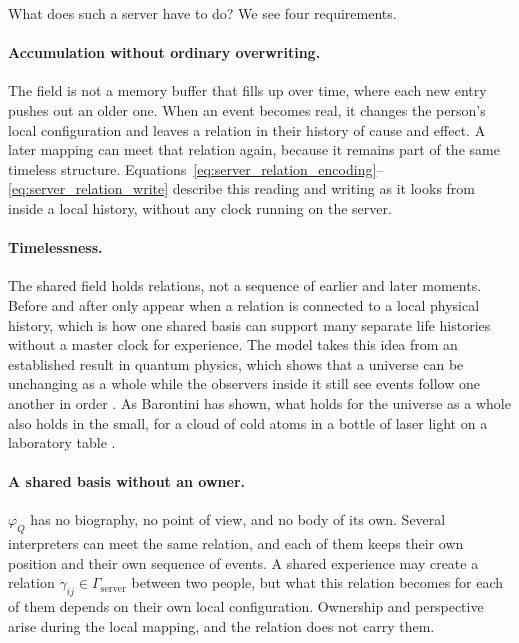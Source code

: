 What does such a server have to do? We see four requirements.

\paragraph{Accumulation without ordinary overwriting.}
The field is not a memory buffer that fills up over time, where each new entry pushes
out an older one. When an event becomes real, it changes the person's local
configuration and leaves a relation in their history of cause and effect. A later
mapping can meet that relation again, because it remains part of the same timeless
structure. Equations~\eqref{eq:server_relation_encoding}--\eqref{eq:server_relation_write}
describe this reading and writing as it looks from inside a local history, without any
clock running on the server.

\paragraph{Timelessness.}
The shared field holds relations, not a sequence of earlier and later moments. Before
and after only appear when a relation is connected to a local physical history, which
is how one shared basis can support many separate life histories without a master
clock for experience. The model takes this idea from an established result in quantum
physics, which shows that a universe can be unchanging as a whole while the observers
inside it still see events follow one another in order \citep{pagewootters1983}.
As Barontini has shown, what holds for the universe as a whole also holds in the
small, for a cloud of cold atoms in a bottle of laser light on a laboratory table
\citep{barontini2026}.

\paragraph{A shared basis without an owner.}
$\varphi_Q$ has no biography, no point of view, and no body of its own. Several
interpreters can meet the same relation, and each of them keeps their own position and
their own sequence of events. A shared experience may create a relation
$\gamma_{ij}\in\Gamma_{\mathrm{server}}$ between two people, but what this relation
becomes for each of them depends on their own local configuration. Ownership and
perspective arise during the local mapping, and the relation does not carry them.


